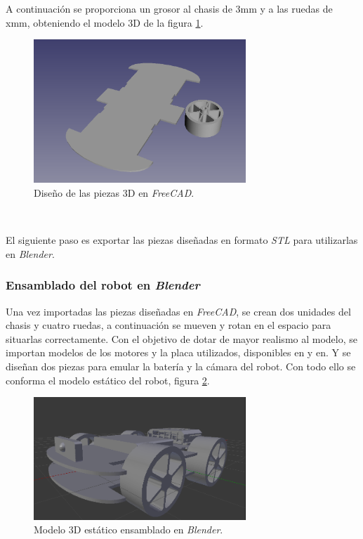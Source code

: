 A continuación se proporciona un grosor al chasis de 3mm y a las ruedas de xmm, obteniendo el modelo 3D de la figura \ref{fig:design3Dfreecad}.\\

\begin{figure} [h!]
	\begin{center}
		\includegraphics[width=8cm]{figs/freecad}
	\end{center}
	\caption{Diseño de las piezas 3D en \textit{FreeCAD}.}
	\label{fig:design3Dfreecad}
\end{figure}\

El siguiente paso es exportar las piezas diseñadas en formato \textit{STL} para utilizarlas en \textit{Blender}.\\

\subsubsection{Ensamblado del robot en \textit{Blender}}

Una vez importadas las piezas diseñadas en \textit{FreeCAD}, se crean dos unidades del chasis y cuatro ruedas, a continuación se mueven y rotan en el espacio para situarlas
correctamente. Con el objetivo de dotar de mayor realismo al modelo, se importan modelos de los motores y la placa utilizados, disponibles en y en. Y se diseñan dos piezas para
emular la batería y la cámara del robot. Con todo ello se conforma el modelo estático del robot, figura \ref{fig:blendermodel}.\\

\begin{figure} [h!]
	\begin{center}
		\includegraphics[width=8cm]{figs/blenderModel}
	\end{center}
	\caption{Modelo 3D estático ensamblado en \textit{Blender}.}
	\label{fig:blendermodel}
\end{figure}\


